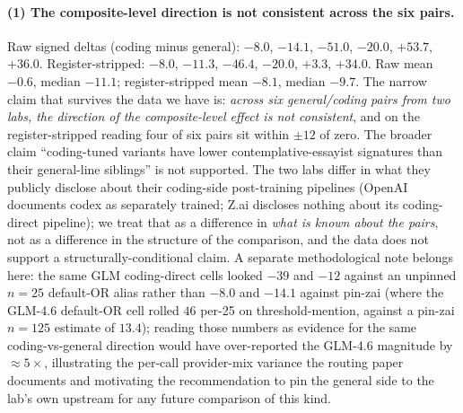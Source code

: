 \documentclass[11pt,a4paper]{article}
\begin{document}
\paragraph{(1) The composite-level direction is not consistent across the six pairs.} Raw signed deltas (coding minus general): $-8.0$, $-14.1$, $-51.0$, $-20.0$, $+53.7$, $+36.0$. Register-stripped: $-8.0$, $-11.3$, $-46.4$, $-20.0$, $+3.3$, $+34.0$. Raw mean $-0.6$, median $-11.1$; register-stripped mean $-8.1$, median $-9.7$. The narrow claim that survives the data we have is: \emph{across six general/coding pairs from two labs, the direction of the composite-level effect is not consistent}, and on the register-stripped reading four of six pairs sit within $\pm 12$ of zero. The broader claim ``coding-tuned variants have lower contemplative-essayist signatures than their general-line siblings'' is not supported. The two labs differ in what they publicly disclose about their coding-side post-training pipelines (OpenAI documents codex as separately trained; Z.ai discloses nothing about its coding-direct pipeline); we treat that as a difference in \emph{what is known about the pairs}, not as a difference in the structure of the comparison, and the data does not support a structurally-conditional claim. A separate methodological note belongs here: the same GLM coding-direct cells looked $-39$ and $-12$ against an unpinned $n{=}25$ default-OR alias rather than $-8.0$ and $-14.1$ against pin-zai (where the GLM-4.6 default-OR cell rolled $46$ per-25 on threshold-mention, against a pin-zai $n{=}125$ estimate of $13.4$); reading those numbers as evidence for the same coding-vs-general direction would have over-reported the GLM-4.6 magnitude by $\approx 5\times$, illustrating the per-call provider-mix variance the routing paper documents \citep{tenner2026routing} and motivating the recommendation to pin the general side to the lab's own upstream for any future comparison of this kind.
\end{document}
